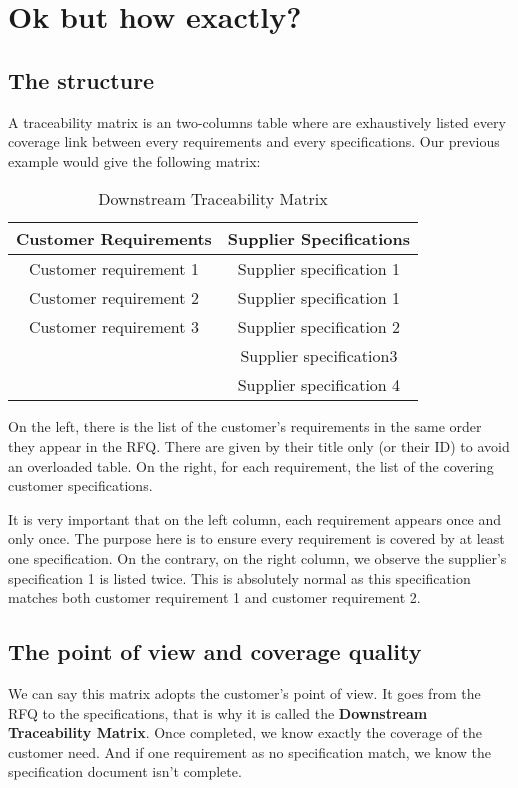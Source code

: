 \section{Ok but how exactly?}
\subsection{The structure}
A traceability matrix is an two-columns table where are exhaustively listed every coverage link between every requirements and every specifications. Our previous example would give the following matrix:

\begin{table*}
	\centering
		\begin{tabular}{|c|c|}
			\hline
			\textbf{Customer Requirements} & \textbf{Supplier Specifications}\\
            \hline
            Customer requirement 1 & Supplier specification 1\\
            \hline
            Customer requirement 2 & Supplier specification 1\\
            \hline
            Customer requirement 3 & Supplier specification 2\\
            &Supplier specification3\\
            &Supplier specification 4\\
            \hline
		\end{tabular}
	\caption{Downstream Traceability Matrix}
	\label{tab:DownstreamTraceabilityMatrix}
\end{table*}

On the left, there is the list of the customer’s requirements in the same order they appear in the RFQ. There are given by their title only (or their ID) to avoid an overloaded table.
On the right, for each requirement, the list of the covering customer specifications.

It is very important that on the left column, each requirement appears once and only once. The purpose here is to ensure every requirement is covered by at least one specification.
On the contrary, on the right column, we observe the supplier’s specification 1 is listed twice. This is absolutely normal as this specification matches both customer requirement 1 and customer requirement 2.

\subsection{The point of view and coverage quality}
We can say this matrix adopts the customer’s point of view. It goes from the RFQ to the specifications, that is why it is called the \textbf{Downstream Traceability Matrix}. Once completed, we know exactly the coverage of the customer need. And if one requirement as no specification match, we know the specification document isn’t complete.

